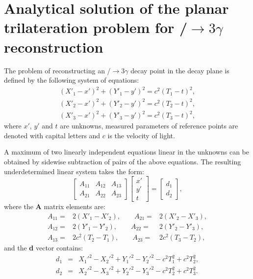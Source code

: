 \chapter{Analytical solution of the planar trilateration problem for \ops/$\to 3\gamma$ reconstruction}\label{appendix:jpet_solution}

The problem of reconstructing an \ops/$\to 3\gamma$ decay point in the decay plane is defined by the following system of equations:
\begin{eqnarray}
  \label{eq:sol_jpet_system}
  (X'_1-x')^2 + (Y'_1-y')^2 = c^2(T_1-t)^2, \\
  (X'_2-x')^2 + (Y'_2-y')^2 = c^2(T_2-t)^2, \\
  (X'_3-x')^2 + (Y'_3-y')^2 = c^2(T_3-t)^2,
\end{eqnarray}
where $x'$, $y'$ and $t$ are unknowns, measured parameters of reference points are denoted with capital letters and $c$ is the velocity of light.

A maximum of two linearly independent equations linear in the unknowns can be obtained by sidewise subtraction of pairs of the above equations. The resulting underdetermined linear system takes the form:
\begin{equation}
  \label{eq:sol_jpet_linear}
  \begin{bmatrix}
    A_{11} & A_{12} & A_{13} \\
    A_{21} & A_{22} & A_{23} 
  \end{bmatrix}
  \begin{bmatrix}
    x' \\
    y' \\
    t
  \end{bmatrix}
  =
  \begin{bmatrix}
    d_1 \\
    d_2
  \end{bmatrix},
\end{equation}
where the \textbf{A} matrix elements are:
\begin{eqnarray*}
  \label{eq:sol_jpet_elements}
  A_{11} =& 2(X'_1-X'_2), \qquad A_{21} =& 2(X'_2-X'_3), \\
  A_{12} =& 2(Y'_1-Y'_2), \qquad A_{22} =& 2(Y'_2-Y'_3), \\
  A_{13} =& 2c^2(T_2-T_1), \qquad A_{23} =&  2c^2(T_3-T_2),
\end{eqnarray*}
and the \textbf{d} vector contains:
\begin{eqnarray*}
  \label{eq:sol_jpet_belements}
  d_1 &=& X_1'^2-X_2'^2 + Y_1'^2 - Y_2'^2 - c^2T_1^2 + c^2T_2^2, \\
  d_2 &=& X_2'^2-X_3'^2 + Y_2'^2 - Y_3'^2 - c^2T_2^2 + c^2T_3^2.
\end{eqnarray*}

